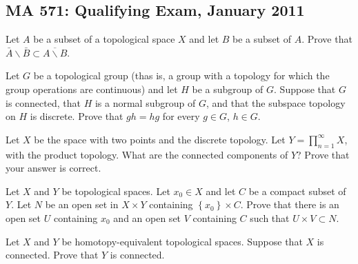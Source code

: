 \subsection{MA 571: Qualifying Exam, January 2011}
\setcounter{exercise}{0}

\begin{problem}
Let $A$ be a subset of a topological space $X$ and let $B$ be a subset of
$A$. Prove that $\bar A\smallsetminus\bar B\subset\overline{A\smallsetminus B}$.
\end{problem}
\begin{solution}
\end{solution}

\begin{problem}
Let $G$ be a topological group (thas is, a group with a topology for which
the group operations are continuous) and let $H$ be a subgroup of
$G$. Suppose that $G$ is connected, that $H$ is a normal subgroup of $G$,
and that the subspace topology on $H$ is discrete. Prove that $gh=hg$ for
every $g\in G$, $h\in G$.
\end{problem}
\begin{solution}
\end{solution}

\begin{problem}
Let $X$ be the space with two points and the discrete topology. Let
$Y=\prod_{n=1}^\infty X$, with the product topology. What are the connected
components of $Y$? Prove that your answer is correct.
\end{problem}
\begin{solution}
\end{solution}

\begin{problem}
Let $X$ and $Y$ be topological spaces. Let $x_0\in X$ and let $C$ be a
compact subset of $Y$. Let $N$ be an open set in $X\times Y$ containing
$\left\{x_0\right\}\times C$. Prove that there is an open set $U$
containing $x_0$ and an open set $V$ containing $C$ such that $U\times
V\subset N$.
\end{problem}
\begin{solution}
\end{solution}

\begin{problem}
Let $X$ and $Y$ be homotopy-equivalent topological spaces. Suppose that $X$
is connected. Prove that $Y$ is connected.
\end{problem}
\begin{solution}
\end{solution}

